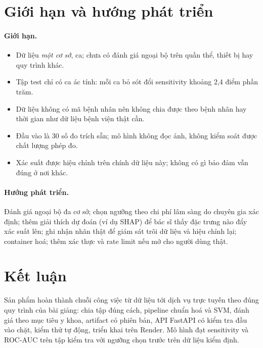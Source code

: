 \documentclass[12pt]{article}
\begin{document}
\section{Giới hạn và hướng phát triển}

\paragraph{Giới hạn.}
\begin{itemize}
  \item Dữ liệu \emph{một cơ sở}, \NSamples{} ca; chưa có đánh giá ngoại bộ trên quần thể, thiết bị hay quy trình khác.
  \item Tập test chỉ có \TestMalignant{} ca ác tính: mỗi ca bỏ sót đổi sensitivity khoảng 2,4 điểm phần trăm.
  \item Dữ liệu không có mã bệnh nhân nên không chia được theo bệnh nhân hay thời gian như dữ liệu bệnh viện thật cần.
  \item Đầu vào là 30 số đo trích sẵn; mô hình không đọc ảnh, không kiểm soát được chất lượng phép đo.
  \item Xác suất được hiệu chỉnh trên chính dữ liệu này; không có gì bảo đảm vẫn đúng ở nơi khác.
\end{itemize}

\paragraph{Hướng phát triển.} Đánh giá ngoại bộ đa cơ sở; chọn ngưỡng theo chi phí lâm sàng do chuyên gia xác định;
thêm giải thích dự đoán (ví dụ SHAP) để bác sĩ thấy đặc trưng nào đẩy xác suất lên; ghi nhận nhãn thật để giám sát
trôi dữ liệu và hiệu chỉnh lại; container hoá; thêm xác thực và rate limit nếu mở cho người dùng thật.

\section{Kết luận}

Sản phẩm hoàn thành chuỗi công việc từ dữ liệu tới dịch vụ trực tuyến theo đúng quy trình của bài giảng: chia tập
đúng cách, pipeline chuẩn hoá và SVM, đánh giá theo mục tiêu y khoa, artifact có phiên bản, API FastAPI có kiểm tra
đầu vào chặt, kiểm thử tự động, triển khai trên Render. Mô hình đạt sensitivity \TestSens{} và ROC-AUC \TestAUC{} trên
tập kiểm tra với ngưỡng \Threshold{} chọn trước trên dữ liệu kiểm định.
\end{document}
